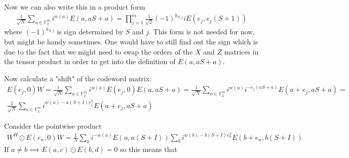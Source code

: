 \documentclass{article}
\begin{document}
	Now we can also write this in a product form
	\begin{align*}
		\frac{1}{\sqrt{N}} \sum_{a \in \mathbb{F}^m_2} i^{w(a)}E(a,aS + a) = \prod_{j = 1}^m\frac{1}{\sqrt{2}}  (-1)^{k_{S, j}}iE(e_j, e_j(S + 1))
	\end{align*}
	where $(-1)^{k_{S, j}}$ is sign determined by $S$ and $j$. This form is not needed for now, but might be handy sometimes. One would have to still find out the sign which is due to the fact that we might need to swap the orders of the $X$ and $Z$ matrices in the tensor product in order to get into the definition of $E(a, aS + a)$.
	
	Now calculate a "shift" of the codeword matrix:
	\begin{align*}
		E(e_j, 0)W = \frac{1}{\sqrt{N}} \sum_{a \in \mathbb{F}^m_2} i^{w(a)}E(e_j,0)E(a,aS + a) = \frac{1}{\sqrt{N}} \sum_{a \in \mathbb{F}^m_2} i^{w(a)}i^{-e_j(aS + a)}E(a + e_j,aS + a)  = \\ \frac{1}{\sqrt{N}} \sum_{a \in \mathbb{F}^m_2} i^{w(a)-a(S + I)e_j^T}E(a + e_j,aS + a)
	\end{align*}
	
	\vspace{10mm}
	
	Consider the pointwise product
	\begin{align*}
		W^H \odot E(e_n, 0)W = \frac{1}{N} \sum_a i^{-w(a)} E(a, a(S + I)) \sum_b i^{w(b) - b(S + I)e_n^T} E(b + e_n, b(S + I))
	\end{align*}
	If $a \neq b \implies E(a, c) \odot E(b, d) = 0$ so this means that
	
\end{document}
